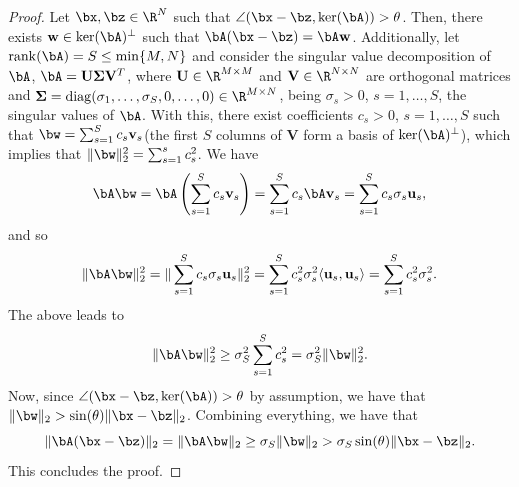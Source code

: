 \documentclass[11pt]{amsart}
\begin{document}
\begin{proof} Let $\bx, \bz\in\R^N$ such that $\angle (\bx-\bz,\ker(\bA))> \theta$. Then, there exists $\mathbf{w}\in\ker(\bA)^\perp$ such that $\bA(\bx-\bz)=\bA\mathbf{w}$. Additionally, let $\mathrm{rank}(\bA)=S\leq\min\{M,N\}$ and consider the singular value decomposition of $\bA$, $\bA=\mathbf{U}\boldsymbol{\Sigma}\mathbf{V}^T$, where $\mathbf{U}\in\R^{M\times M}$ and $\mathbf{V}\in\R^{N\times N}$ are orthogonal matrices and $\boldsymbol{\Sigma}=\mathrm{diag}(\sigma_1,\ldots,\sigma_S,0,\ldots,0)\in\R^{M\times N}$, being $\sigma_s>0$, $s=1,\ldots, S$, the singular values of $\bA$. With this, there exist coefficients $c_s>0$, $s=1,\ldots, S$ such that $\bw=\sum_{s=1}^S c_s\mathbf{v}_s$(the first $S$ columns of $\mathbf{V}$ form a basis of $\ker(\bA)^\perp$), which implies that $\|\bw\|_2^2=\sum_{s=1}^s c_s^2$. We have
$$
\bA\bw=\bA\left(\sum_{s=1}^S c_s\mathbf{v}_s\right)=\sum_{s=1}^S c_s\bA\mathbf{v}_s=\sum_{s=1}^S c_s\sigma_s\mathbf{u}_s,
$$
and so
$$
\|\bA\bw\|_2^2=\|\sum_{s=1}^S c_s\sigma_s\mathbf{u}_s\|_2^2=\sum_{s=1}^Sc_s^2\sigma_s^2\langle\mathbf{u}_s,\mathbf{u}_s\rangle=\sum_{s=1}^Sc_s^2\sigma_s^2.
$$
The above leads to
$$
\|\bA\bw\|_2^2\geq\sigma_S^2\sum_{s=1}^Sc_s^2=\sigma_{S}^2\|\bw\|_2^2.
$$
Now, since $\angle (\bx-\bz,\ker(\bA))> \theta$ by assumption, we have that $\|\bw\|_2>\sin(\theta)\|\bx-\bz\|_2$. Combining everything, we have that
$$
\|\bA(\bx-\bz)\|_2=\|\bA\bw\|_2\geq\sigma_S\|\bw\|_2>\sigma_S\sin(\theta)\|\bx-\bz\|_2.
$$
This concludes the proof.
\end{proof}
\end{document}
